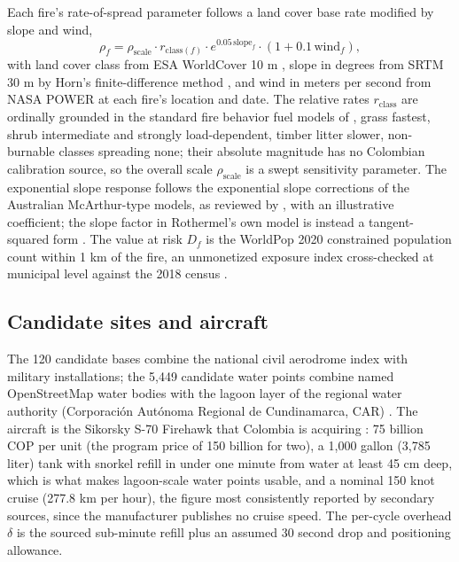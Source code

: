 \documentclass[11pt]{article}
\begin{document}
Each fire's rate-of-spread parameter follows a land cover base rate
modified by slope and wind,
\begin{equation}
\rho_f = \rho_{\mathrm{scale}} \cdot r_{\mathrm{class}(f)} \cdot
e^{0.05\, \mathrm{slope}_f} \cdot (1 + 0.1\, \mathrm{wind}_f),
\label{eq:ros}
\end{equation}
with land cover class from ESA WorldCover 10 m \citep{worldcover},
slope in degrees from SRTM 30 m \citep{srtm,farr2007} by Horn's
finite-difference method \citep{tang2011}, and wind in meters per
second from NASA POWER
\citep{nasapower} at each fire's location and date. The relative rates
$r_{\mathrm{class}}$ are ordinally grounded in the standard fire
behavior fuel models of \citet{scott2005}, grass fastest, shrub
intermediate and strongly load-dependent, timber litter slower,
non-burnable classes spreading none; their absolute magnitude has no
Colombian calibration source, so the overall scale
$\rho_{\mathrm{scale}}$ is a swept sensitivity parameter. The
exponential slope response follows the exponential slope corrections
of the Australian McArthur-type models, as reviewed by
\citet{sharples2008}, with an illustrative coefficient; the slope
factor in Rothermel's own model is instead a tangent-squared form
\citep{andrews2018}. The value at risk $D_f$ is the WorldPop
2020 constrained population count \citep{worldpop} within 1 km of the
fire, an unmonetized exposure index cross-checked at municipal level
against the 2018 census \citep{dane2018}.

\subsection{Candidate sites and aircraft}

The 120 candidate bases combine the national civil aerodrome index
\citep{aerocivil2025} with military installations; the 5,449 candidate
water points combine named OpenStreetMap water bodies \citep{osm} with
the lagoon layer of the regional water authority (Corporaci{\'o}n
Aut{\'o}noma Regional de Cundinamarca, CAR) \citep{car2026}. The
aircraft is the Sikorsky S-70 Firehawk that Colombia is acquiring
\citep{fac2025}: 75 billion COP per unit (the program price of 150
billion for two), a 1{,}000 gallon (3{,}785 liter) tank with snorkel
refill in under one minute \citep{lockheedfirehawk} from water at
least 45 cm deep, which is what makes lagoon-scale water points
usable, and a nominal 150 knot cruise (277.8 km per hour), the figure
most consistently reported by secondary sources, since the
manufacturer publishes no cruise speed. The per-cycle overhead $\delta$ is the
sourced sub-minute refill plus an assumed 30 second drop and
positioning allowance.
\end{document}
